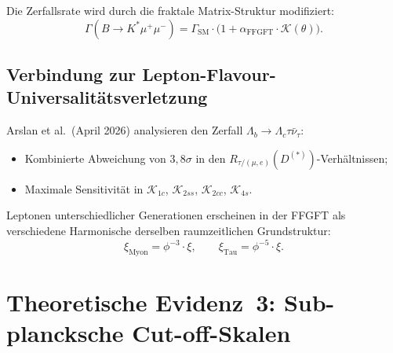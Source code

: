 Die Zerfallsrate wird durch die fraktale Matrix-Struktur modifiziert:
\begin{equation}
  \Gamma(B\to K^*\mu^+\mu^-)
  = \Gamma_{\text{SM}} \cdot
    \bigl(1 + \alpha_{\text{FFGFT}} \cdot \mathcal{K}(\theta)\bigr).
\end{equation}

\subsection{Verbindung zur Lepton-Flavour-Universalitätsverletzung}

Arslan et al.\ (April 2026) \cite{Arslan2026} analysieren den Zerfall
$\Lambda_b \to \Lambda_c\tau\bar{\nu}_\tau$:
\begin{itemize}
  \item Kombinierte Abweichung von $3{,}8\sigma$ in den
        $R_{\tau/(\mu,e)}(D^{(*)})$-Verhältnissen;
  \item Maximale Sensitivität in
        $\mathcal{K}_{1c}$, $\mathcal{K}_{2ss}$, $\mathcal{K}_{2cc}$,
        $\mathcal{K}_{4s}$.
\end{itemize}

Leptonen unterschiedlicher Generationen erscheinen in der FFGFT als
verschiedene Harmonische derselben raumzeitlichen Grundstruktur:
\begin{equation}
  \xi_{\text{Myon}} = \phi^{-3}\cdot\xi, \qquad
  \xi_{\text{Tau}}  = \phi^{-5}\cdot\xi.
\end{equation}

\begin{table}[H]
\centering
\caption{Leptonen als Harmonische der Grundfrequenz~$\xi$}
\smallskip
{}
\end{table}

\section{Theoretische Evidenz~3: Sub-plancksche Cut-off-Skalen}


